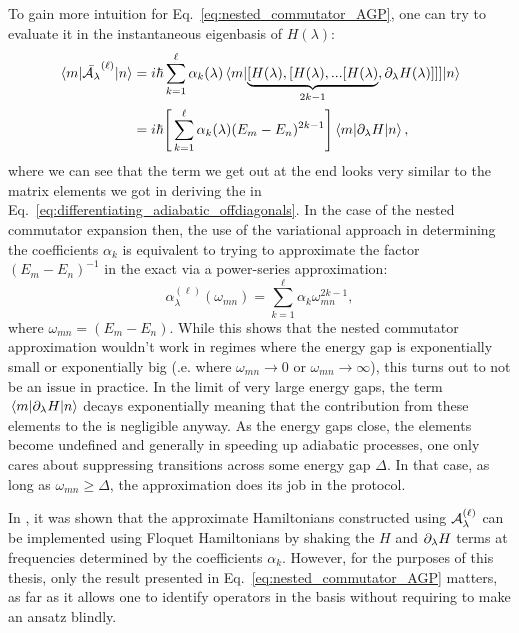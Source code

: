     To gain more intuition for Eq.~\eqref{eq:nested_commutator_AGP}, one can try to evaluate it in the instantaneous eigenbasis of $H(\lambda)$:
    \begin{equation}\label{eq:nested_commutator_matrix_elements}
        \begin{aligned}
            \mel*{m}{\Bar{\mathcal{A}_{\lambda}}^{(\ell)}}{n} &= i\hbar \sum_{k=1}^\ell \alpha_k(\lambda) \mel*{m}{\underbrace{[H(\lambda),[H(\lambda),...[H(\lambda)}_{2k-1},\partial_{\lambda} H(\lambda)]]]}{n} \\
            &= i\hbar \Bigg[ \sum_{k=1}^\ell \alpha_k(\lambda)(E_m - E_n)^{2k - 1} \Bigg] \mel{m}{\partial_{\lambda}H}{n},
        \end{aligned}
    \end{equation}
    where we can see that the term we get out at the end looks very similar to the matrix elements we got in deriving the  in Eq.~\eqref{eq:differentiating_adiabatic_offdiagonals}. In the case of the nested commutator expansion then, the use of the variational  approach in determining the coefficients $\alpha_k$ is equivalent to trying to approximate the factor $(E_m - E_n)^{- 1}$ in the exact  via a power-series approximation:
    \begin{equation}
        \alpha_{\lambda}^{(\ell)}(\omega_{mn}) = \sum_{k=1}^\ell \alpha_k \omega_{mn}^{2k - 1},
    \end{equation}
    where $\omega_{mn} = (E_m - E_n)$. While this shows that the nested commutator approximation wouldn't work in regimes where the energy gap is exponentially small or exponentially big (\@i.e. where $\omega_{mn} \rightarrow 0$ or $\omega_{mn} \rightarrow \infty$), this turns out to not be an issue in practice. In the limit of very large energy gaps, the term $\mel{m}{\partial_{\lambda}H}{n}$ decays exponentially meaning that the contribution from these elements to the  is negligible anyway. As the energy gaps close, the  elements become undefined and generally in speeding up adiabatic processes, one only cares about suppressing transitions across some energy gap $\Delta$. In that case, as long as $\omega_{mn} \geq \Delta$, the approximation does its job in the  protocol.

    In \cite{claeys_floquet-engineering_2019}, it was shown that the approximate  Hamiltonians constructed using $\mathcal{A}_{\lambda}^{(\ell)}$ can be implemented using Floquet Hamiltonians \cite{goldman_periodically_2014} by shaking the $H$ and $\partial_{\lambda} H$ terms at frequencies determined by the coefficients $\alpha_k$. However, for the purposes of this thesis, only the result presented in Eq.~\eqref{eq:nested_commutator_AGP} matters, as far as it allows one to identify operators in the  basis without requiring to make an ansatz blindly.
